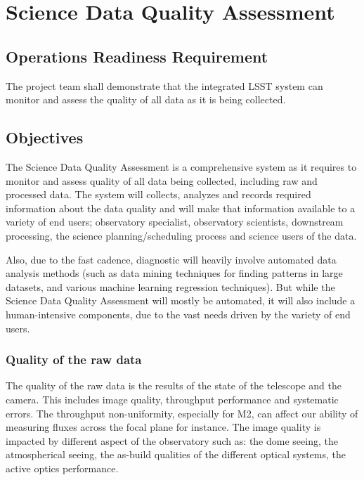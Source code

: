 \section{Science Data Quality Assessment}  \label{sec:sdqa}


\subsection{Operations Readiness Requirement}

The project team shall demonstrate that the integrated LSST system can monitor and assess the quality of all data as it is being collected.

\subsection{Objectives} 

The Science Data Quality Assessment is a comprehensive system as it requires to monitor and assess quality of all data being collected, including raw and processed data. The system will collects, analyzes and records required information about the data quality and will make that information available to a variety of end users; observatory specialist, observatory scientists, downstream processing, the science planning/scheduling process and science users of the data. 

Also, due to the fast cadence, diagnostic will heavily involve automated data analysis methods (such as data mining techniques for finding patterns in large datasets, and various machine learning regression techniques). But while the Science Data Quality Assessment will mostly be automated, it will also include a human-intensive components, due to the vast needs driven by the variety of end users.

\subsubsection{Quality of the raw data} 

The quality of the raw data is the results of the state of the telescope and the camera. This includes image quality, throughput performance and systematic errors. The throughput non-uniformity, especially for M2, can affect our ability of measuring fluxes across the focal plane for instance. The image quality is impacted by different aspect of the observatory such as: the dome seeing, the atmospherical seeing, the as-build qualities of the different optical systems, the active optics performance. 

